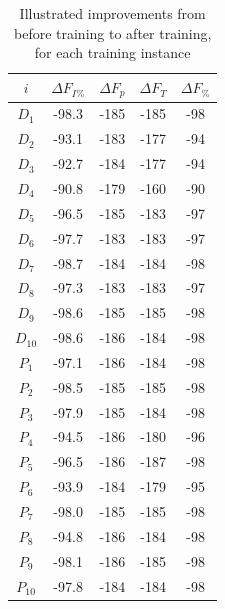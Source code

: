 \documentclass[12pt, titlepage]{report}
\theoremstyle{definition}
\begin{document}
\begin{table}
\begin{tabular}{cSSSS} \toprule
    {$i$}  & {$\Delta F_{I\%}$}	            & {$\Delta F_p$} 	    & {$\Delta F_T$} 	        & {$\Delta F_{\%}$} \\ \midrule
    $D_1$  & -98.3 							& -185 					& -185    	 				& -98 \\
    $D_2$  & -93.1 							& -183 					& -177  					& -94 \\
    $D_3$  & -92.7							& -184 					& -177  					& -94 \\
    $D_4$  & -90.8 							& -179 					& -160 					    & -90 \\
    $D_5$  & -96.5 							& -185 					& -183						& -97 \\
    $D_6$  & -97.7 							& -183 					& -183	  					& -97 \\
    $D_7$  & -98.7 							& -184 					& -184	  					& -98 \\
    $D_8$  & -97.3 							& -183 					& -183	  					& -97 \\
    $D_9$  & -98.6 							& -185 					& -185	  					& -98 \\
    $D_{10}$ & -98.6 						& -186 					& -184	  					& -98 \\ \midrule
    $P_1$  & -97.1  						& -186 					& -184		 				& -98 \\
    $P_2$  & -98.5  						& -185 					& -185	  					& -98 \\
    $P_3$  & -97.9 							& -185 					& -184	  					& -98 \\
    $P_4$  & -94.5  						& -186 					& -180  					& -96 \\
    $P_5$  & -96.5 							& -186 					& -187	   					& -98 \\
    $P_6$  & -93.9  						& -184 					& -179  					& -95 \\
    $P_7$  & -98.0  						& -185 					& -185	  					& -98 \\
    $P_8$  & -94.8  						& -186 					& -184	  					& -98 \\
    $P_9$  & -98.1  						& -186 					& -185	  					& -98 \\
    $P_{10}$ & -97.8  						& -184 					& -184						& -98 \\ \bottomrule
\end{tabular}

\caption{Illustrated improvements from before training to after training, for each training instance}
\end{table}
\end{document}
